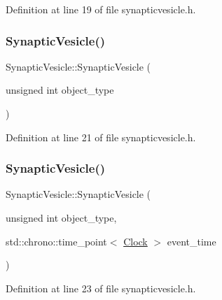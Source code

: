 Definition at line 19 of file synapticvesicle.\+h.

\mbox{\label{class_synaptic_vesicle_aefd8a743e80077235a1c9a9fd133cc9d}} 
\subsubsection{\texorpdfstring{Synaptic\+Vesicle()}{SynapticVesicle()}\hspace{0.1cm}{\footnotesize\ttfamily [2/4]}}
{\footnotesize\ttfamily Synaptic\+Vesicle\+::\+Synaptic\+Vesicle (\begin{DoxyParamCaption}\item[{unsigned int}]{object\+\_\+type }\end{DoxyParamCaption})\hspace{0.3cm}{\ttfamily [inline]}}



Definition at line 21 of file synapticvesicle.\+h.

\mbox{\label{class_synaptic_vesicle_a6602b03ba498129b46c173e8fa66927b}} 
\subsubsection{\texorpdfstring{Synaptic\+Vesicle()}{SynapticVesicle()}\hspace{0.1cm}{\footnotesize\ttfamily [3/4]}}
{\footnotesize\ttfamily Synaptic\+Vesicle\+::\+Synaptic\+Vesicle (\begin{DoxyParamCaption}\item[{unsigned int}]{object\+\_\+type,  }\item[{std\+::chrono\+::time\+\_\+point$<$ \hyperlink{universe_8h_a0ef8d951d1ca5ab3cfaf7ab4c7a6fd80}{Clock} $>$}]{event\+\_\+time }\end{DoxyParamCaption})\hspace{0.3cm}{\ttfamily [inline]}}



Definition at line 23 of file synapticvesicle.\+h.

\mbox{\label{class_synaptic_vesicle_a0f86278b771137978d03bb6cf460a527}} 
